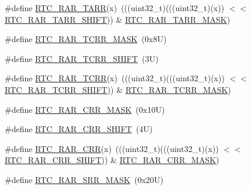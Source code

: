 \begin{DoxyCompactItemize}
\item 
\#define \mbox{\hyperlink{group___r_t_c___register___masks_ga6ecb00f2d94bc0ddd18813444d5ba23c}{R\+T\+C\+\_\+\+R\+A\+R\+\_\+\+T\+A\+RR}}(x)~(((uint32\+\_\+t)(((uint32\+\_\+t)(x)) $<$$<$ \mbox{\hyperlink{group___r_t_c___register___masks_ga65e8ec7e88a1f0583d53c603bdab1615}{R\+T\+C\+\_\+\+R\+A\+R\+\_\+\+T\+A\+R\+R\+\_\+\+S\+H\+I\+FT}})) \& \mbox{\hyperlink{group___r_t_c___register___masks_ga33ae5982aca9e8f6c95d69127938e30c}{R\+T\+C\+\_\+\+R\+A\+R\+\_\+\+T\+A\+R\+R\+\_\+\+M\+A\+SK}})
\item 
\#define \mbox{\hyperlink{group___r_t_c___register___masks_gaadb8c80e2d922625e97912b3692b3813}{R\+T\+C\+\_\+\+R\+A\+R\+\_\+\+T\+C\+R\+R\+\_\+\+M\+A\+SK}}~(0x8\+U)
\item 
\#define \mbox{\hyperlink{group___r_t_c___register___masks_ga62bf3cee6fc4d16d4ac71912130a72df}{R\+T\+C\+\_\+\+R\+A\+R\+\_\+\+T\+C\+R\+R\+\_\+\+S\+H\+I\+FT}}~(3\+U)
\item 
\#define \mbox{\hyperlink{group___r_t_c___register___masks_ga412e2f31b1d825bddb2855bab7dbdad6}{R\+T\+C\+\_\+\+R\+A\+R\+\_\+\+T\+C\+RR}}(x)~(((uint32\+\_\+t)(((uint32\+\_\+t)(x)) $<$$<$ \mbox{\hyperlink{group___r_t_c___register___masks_ga62bf3cee6fc4d16d4ac71912130a72df}{R\+T\+C\+\_\+\+R\+A\+R\+\_\+\+T\+C\+R\+R\+\_\+\+S\+H\+I\+FT}})) \& \mbox{\hyperlink{group___r_t_c___register___masks_gaadb8c80e2d922625e97912b3692b3813}{R\+T\+C\+\_\+\+R\+A\+R\+\_\+\+T\+C\+R\+R\+\_\+\+M\+A\+SK}})
\item 
\#define \mbox{\hyperlink{group___r_t_c___register___masks_gad35d06502770fe19b836353c9e77c8d1}{R\+T\+C\+\_\+\+R\+A\+R\+\_\+\+C\+R\+R\+\_\+\+M\+A\+SK}}~(0x10\+U)
\item 
\#define \mbox{\hyperlink{group___r_t_c___register___masks_gab184f1269ead4310ffb856ec7fb43171}{R\+T\+C\+\_\+\+R\+A\+R\+\_\+\+C\+R\+R\+\_\+\+S\+H\+I\+FT}}~(4\+U)
\item 
\#define \mbox{\hyperlink{group___r_t_c___register___masks_ga2cf763d575d06556477fbcc99505c54b}{R\+T\+C\+\_\+\+R\+A\+R\+\_\+\+C\+RR}}(x)~(((uint32\+\_\+t)(((uint32\+\_\+t)(x)) $<$$<$ \mbox{\hyperlink{group___r_t_c___register___masks_gab184f1269ead4310ffb856ec7fb43171}{R\+T\+C\+\_\+\+R\+A\+R\+\_\+\+C\+R\+R\+\_\+\+S\+H\+I\+FT}})) \& \mbox{\hyperlink{group___r_t_c___register___masks_gad35d06502770fe19b836353c9e77c8d1}{R\+T\+C\+\_\+\+R\+A\+R\+\_\+\+C\+R\+R\+\_\+\+M\+A\+SK}})
\item 
\#define \mbox{\hyperlink{group___r_t_c___register___masks_gae53f1b7345f96a9c760070c09cb681d9}{R\+T\+C\+\_\+\+R\+A\+R\+\_\+\+S\+R\+R\+\_\+\+M\+A\+SK}}~(0x20\+U)
$$
\end{DoxyCompactItemize}
